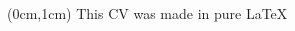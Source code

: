\documentclass[10pt,a4paper,ragged2e,withhyper]{altacv/altacv}
\begin{document}
\begin{paracol}{2}











\end{paracol}

\begin{textblock*}{\textwidth}(0cm,1cm)
  \centering
  {\scriptsize This CV was made in pure \LaTeX}
\end{textblock*}
\end{document}
